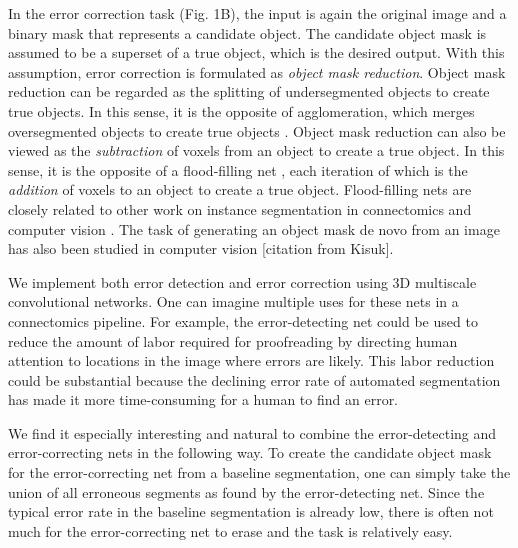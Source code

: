 \documentclass{article}
\begin{document}
In the error correction task (Fig. 1B), the input is again the original image and a binary mask that represents a candidate object. The candidate object mask is assumed to be a superset of a true object, which is the desired output. With this assumption, error correction is formulated as \emph{object mask reduction}.
Object mask reduction can be regarded as the splitting of undersegmented objects to create true objects. In this sense, it is the opposite of agglomeration, which merges oversegmented objects to create true objects \cite{lash,gala}. Object mask reduction can also be viewed as the \emph{subtraction} of voxels from an object to create a true object. In this sense, it is the opposite of a flood-filling net \cite{floodfilling,januszewski2017high}, each iteration of which is the \emph{addition} of voxels to an object to create a true object. Flood-filling nets are closely related to other work on instance segmentation in connectomics \cite{multipass} and computer vision \cite{recurrent_instance_seg_1, recurrent_instance_seg_2}.  The task of generating an object mask de novo from an image has also been studied in computer vision [citation from Kisuk].

We implement both error detection and error correction using 3D multiscale convolutional networks.  One can imagine multiple uses for these nets in a connectomics pipeline. For example, the error-detecting net could be used to reduce the amount of labor required for proofreading by directing human attention to locations in the image where errors are likely. This labor reduction could be substantial because the declining error rate of automated segmentation has made it more time-consuming for a human to find an error.

We find it especially interesting and natural to combine the error-detecting and error-correcting nets in the following way. To create the candidate object mask for the error-correcting net from a baseline segmentation, one can simply take the union of all erroneous segments as found by the error-detecting net. Since the typical error rate in the baseline segmentation is already low, there is often not much for the error-correcting net to erase and the task is relatively easy.

\end{document}
